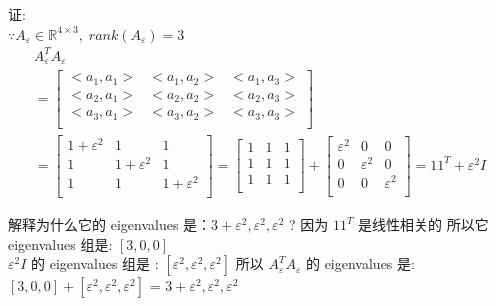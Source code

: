 \documentclass[12pt]{article}
\begin{document}
\begin{flushleft}
    证: \\
    $\because A_{\varepsilon} \in \mathbb{R}^{4 \times 3},\; rank(A_{\varepsilon}) = 3$ \\
    \begin{align}
        A_{\varepsilon}^{T}A_{\varepsilon}                 \\
        =  \begin{bmatrix}
               <a_{1}, a_{1}> & <a_{1},a_{2}> & <a_{1}, a_{3}> \\
               <a_{2}, a_{1}> & <a_{2},a_{2}> & <a_{2}, a_{3}> \\
               <a_{3}, a_{1}> & <a_{3},a_{2}> & <a_{3}, a_{3}> \\
           \end{bmatrix} \\
        =  \begin{bmatrix}
               1 + \varepsilon^{2} & 1                   & 1                   \\
               1                   & 1 + \varepsilon^{2} & 1                   \\
               1                   & 1                   & 1 + \varepsilon^{2} \\
           \end{bmatrix}
        = \begin{bmatrix}
              1 & 1 & 1 \\
              1 & 1 & 1 \\
              1 & 1 & 1 \\
          \end{bmatrix}  + \begin{bmatrix}
                               \varepsilon^{2} & 0               & 0               \\
                               0               & \varepsilon^{2} & 0               \\
                               0               & 0               & \varepsilon^{2} \\
                           \end{bmatrix}
        = 11^{T} + \varepsilon^{2}I
    \end{align}

    解释为什么它的 eigenvalues 是：$3 + \varepsilon^{2},   \varepsilon^{2} ,  \varepsilon^{2} $ ?
    因为 $11^{T}$ 是线性相关的 所以它 eigenvalues 组是: $[3, 0, 0]$ \\
    $\varepsilon^{2}I$ 的 eigenvalues 组是 : $[\varepsilon^{2}, \varepsilon^{2}, \varepsilon^{2}]$
    所以 $A_{\varepsilon}^{T}A_{\varepsilon}$ 的 eigenvalues 是: $[3, 0, 0] + [\varepsilon^{2}, \varepsilon^{2}, \varepsilon^{2}]$
    = $3 + \varepsilon^{2},   \varepsilon^{2} ,  \varepsilon^{2} $ \\



\end{flushleft}
\end{document}

